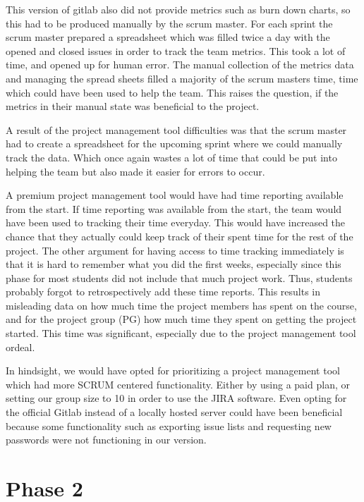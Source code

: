 \documentclass{article}
\begin{document}
This version of gitlab also did not provide metrics such as burn down charts, so this had to be produced manually by the scrum master. For each sprint the scrum master prepared a spreadsheet which was filled twice a day with the opened and closed issues in order to track the team metrics. This took a lot of time, and opened up for human error. The manual collection of the metrics data and managing the spread sheets filled a majority of the scrum masters time, time which could have been used to help the team. This raises the question, if the metrics in their manual state was beneficial to the project.

A result of the project management tool difficulties was that the scrum master had to create a spreadsheet for the upcoming sprint where we could manually track the data. Which once again wastes a lot of time that could be put into helping the team but also made it easier for errors to occur.

A premium project management tool would have had time reporting available from the start. If time reporting was available from the start, the team would have been used to tracking their time everyday. This would have increased the chance that they actually could keep track of their spent time for the rest of the project. The other argument for having access to time tracking immediately is that it is hard to remember what you did the first weeks, especially since this phase for most students did not include that much project work. Thus, students probably forgot to retrospectively add these time reports. This results in misleading data on how much time the project members has spent on the course, and for the project group (PG) how much time they spent on getting the project started. This time was significant, especially due to the project management tool ordeal.  

In hindsight, we would have opted for prioritizing a project management tool which had more SCRUM centered functionality. Either by using a paid plan, or setting our group size to 10 in order to use the JIRA software. Even opting for the official Gitlab instead of a locally hosted server could have been beneficial because some functionality such as exporting issue lists and requesting new passwords were not functioning in our version.

\section{Phase 2} %
\end{document}
